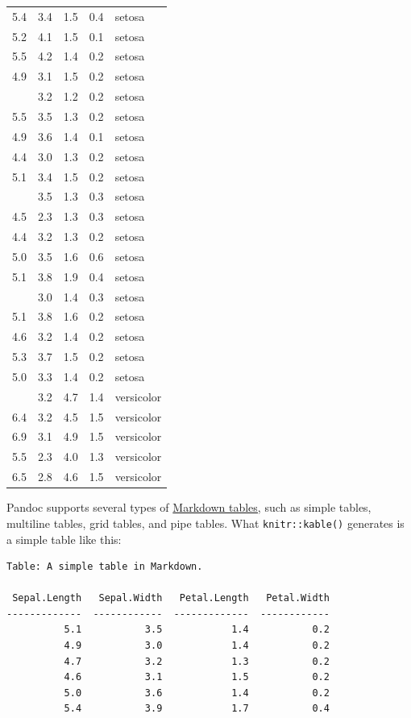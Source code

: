 \documentclass[doctor,openright,twoside]{sjtuthesis}
\newcommand{\passthrough}[1]{#1}
\theoremstyle{plain}
\theoremstyle{definition}
\theoremstyle{remark}
\theoremstyle{ocrenumbox}
\theoremstyle{plain}
\begin{document}
\begin{longtable}{rrrrl}
5.4 & 3.4 & 1.5 & 0.4 & setosa\\
5.2 & 4.1 & 1.5 & 0.1 & setosa\\
5.5 & 4.2 & 1.4 & 0.2 & setosa\\
4.9 & 3.1 & 1.5 & 0.2 & setosa\\
\addlinespace
5.0 & 3.2 & 1.2 & 0.2 & setosa\\
5.5 & 3.5 & 1.3 & 0.2 & setosa\\
4.9 & 3.6 & 1.4 & 0.1 & setosa\\
4.4 & 3.0 & 1.3 & 0.2 & setosa\\
5.1 & 3.4 & 1.5 & 0.2 & setosa\\
\addlinespace
5.0 & 3.5 & 1.3 & 0.3 & setosa\\
4.5 & 2.3 & 1.3 & 0.3 & setosa\\
4.4 & 3.2 & 1.3 & 0.2 & setosa\\
5.0 & 3.5 & 1.6 & 0.6 & setosa\\
5.1 & 3.8 & 1.9 & 0.4 & setosa\\
\addlinespace
4.8 & 3.0 & 1.4 & 0.3 & setosa\\
5.1 & 3.8 & 1.6 & 0.2 & setosa\\
4.6 & 3.2 & 1.4 & 0.2 & setosa\\
5.3 & 3.7 & 1.5 & 0.2 & setosa\\
5.0 & 3.3 & 1.4 & 0.2 & setosa\\
\addlinespace
7.0 & 3.2 & 4.7 & 1.4 & versicolor\\
6.4 & 3.2 & 4.5 & 1.5 & versicolor\\
6.9 & 3.1 & 4.9 & 1.5 & versicolor\\
5.5 & 2.3 & 4.0 & 1.3 & versicolor\\
6.5 & 2.8 & 4.6 & 1.5 & versicolor\\
\bottomrule
\end{longtable}

Pandoc supports several types of \href{http://pandoc.org/MANUAL.html\#tables}{Markdown tables,} such as simple tables, multiline tables, grid tables, and pipe tables. What \passthrough{\lstinline!knitr::kable()!} generates is a simple table like this:

\begin{lstlisting}
Table: A simple table in Markdown.

 Sepal.Length   Sepal.Width   Petal.Length   Petal.Width
-------------  ------------  -------------  ------------
          5.1           3.5            1.4           0.2
          4.9           3.0            1.4           0.2
          4.7           3.2            1.3           0.2
          4.6           3.1            1.5           0.2
          5.0           3.6            1.4           0.2
          5.4           3.9            1.7           0.4
\end{lstlisting}
\end{document}
